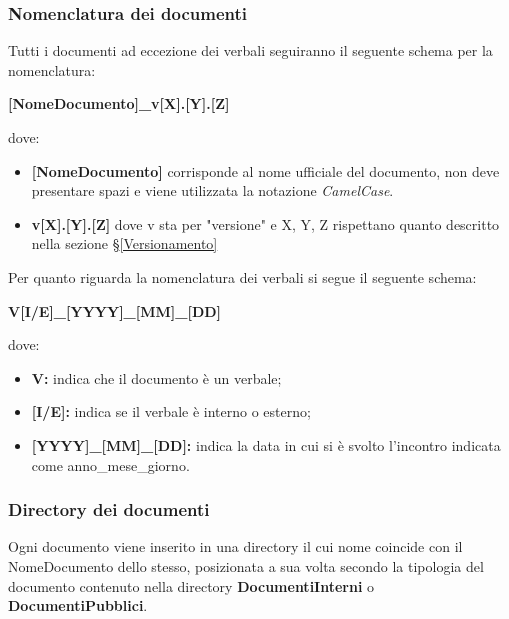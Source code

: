 \subsubsection{Nomenclatura dei documenti} \label{NomenclaturaDoc}
Tutti i documenti ad eccezione dei verbali seguiranno il seguente schema per la nomenclatura:
\begin{center}
	\textbf{[NomeDocumento]\_v[X].[Y].[Z]}
\end{center}
dove:
\begin{itemize}
	\item \textbf{[NomeDocumento]} corrisponde al nome ufficiale del documento, non deve presentare spazi e viene utilizzata la notazione \textit{CamelCase}.
	\item \textbf{v[X].[Y].[Z]} dove v sta per "versione" e X, Y, Z rispettano quanto descritto nella sezione \S\ref{Versionamento}
\end{itemize}

Per quanto riguarda la nomenclatura dei verbali si segue il seguente schema:
\begin{center}
	\textbf{V[I/E]\_[YYYY]\_[MM]\_[DD]}
\end{center}
dove:
\begin{itemize}
	\item \textbf{V:} indica che il documento è un verbale;
	\item \textbf{[I/E]:} indica se il verbale è interno o esterno;
	\item \textbf{[YYYY]\_[MM]\_[DD]:} indica la data in cui si è svolto l'incontro indicata come anno\_mese\_giorno.
\end{itemize}

\subsubsection{Directory dei documenti}
Ogni documento viene inserito in una directory il cui nome coincide con il NomeDocumento dello stesso, posizionata a sua volta secondo la tipologia del documento contenuto nella directory \textbf{DocumentiInterni} o \textbf{DocumentiPubblici}.

